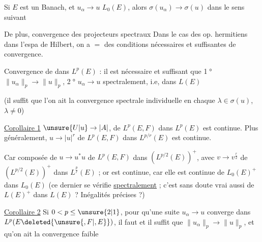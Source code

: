 Si $E$ est un Banach, et $u_\alpha\to u$  $L_0(E)$, alors $\sigma(u_\alpha)\to\sigma(u)$ dans le sens suivant

De plus, convergence des projecteurs spectraux  Dans le cas des op. hermitiens dans l'espa de Hilbert, on a $=$  des conditions nécessaires et suffisantes de convergence.

Convergence de   dans $L^p(E)$ : il est nécessaire et suffisant que \textcircled{\scriptsize 1°} $\|u_\alpha\|_p\to\|u\|_p$, \textcircled{\scriptsize 2°} $u_\alpha\to u$ spectralement, i.e, dans $L(E)$

(il suffit  que l'on ait la convergence spectrale individuelle en chaque $\lambda\in\sigma(u)$, $\lambda\neq0$)

\uline{Corollaire 1} $\unsure{U|u}\to|A|$, de $L^p(E,F)$ dans $L^p(E)$ est continue. Plus généralement, $u\to|u|^r$ de $L^p(E,F)$ dans $L^{p/r}(E)$ est continue.

Car composée de $u\to u^*u$ de $L^p(E,F)$ dans $(L^{p/2}(E))^+$, avec $v\to v^{\frac r2}$ de $(L^{p/2}(E))^+$ dans $L^{\frac pr}(E)$ ; or   est continue, car elle est continue de $L_0(E)^+$ dans $L_0(E)$ (ce dernier  se vérifie \uline{spectralement} ; c'est sans doute vrai aussi de $L(E)^+$ dans $L(E)$ ? Inégalités précises ?)

\uline{Corollaire 2} Si $0<p\leq\unsure{2|1}$, pour qu'une suite  $u_\alpha\to u$ converge dans $L^p(E\deleted{\unsure{,F|,E}})$, il faut et il suffit que $\|u_\alpha\|_p\to\|u\|_p$, et qu'on ait la convergence faible
